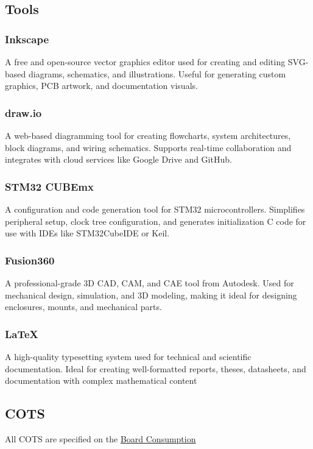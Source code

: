 \subsection{Tools}
\subsubsection{Inkscape}
A free and open-source vector graphics editor used for creating and editing SVG-based diagrams, schematics, and illustrations. Useful for generating custom graphics, PCB artwork, and documentation visuals.
\subsubsection{draw.io}
A web-based diagramming tool for creating flowcharts, system architectures, block diagrams, and wiring schematics. Supports real-time collaboration and integrates with cloud services like Google Drive and GitHub.
\subsubsection{STM32 CUBEmx}
A configuration and code generation tool for STM32 microcontrollers. Simplifies peripheral setup, clock tree configuration, and generates initialization C code for use with IDEs like STM32CubeIDE or Keil.
\subsubsection{Fusion360}
A professional-grade 3D CAD, CAM, and CAE tool from Autodesk. Used for mechanical design, simulation, and 3D modeling, making it ideal for designing enclosures, mounts, and mechanical parts.
\subsubsection{\LaTeX}
A high-quality typesetting system used for technical and scientific documentation. Ideal for creating well-formatted reports, theses, datasheets, and documentation with complex mathematical content
\subsection{COTS}
All COTS are specified on the \hyperref[link:Board Consumption]{Board Consumption}
